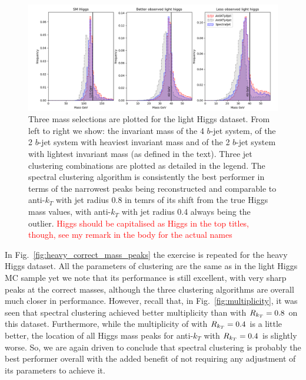 \begin{figure}[htp]
    \includegraphics[width=1.\textwidth]{graphics/mass_peaks/light_long_correct_frequency.png}
    \caption{Three mass selections are plotted for the light Higgs dataset. From left to right we show: the invariant mass of the 4 $b$-jet system, of the 2 $b$-jet system with heaviest invariant mass and of the 2 $b$-jet system with lightest invariant mass (as defined in the text).   Three jet clustering combinations are plotted as detailed in the legend.
The spectral clustering algorithm is consistently the best performer in terms of the narrowest peaks being reconstructed and comparable to anti-$k_T$ with jet radius 0.8 in temrs of its shift from the true Higgs mass values, with  anti-$k_T$ with jet radius 0.4 always being the outlier. 
{\textcolor{red}{Higgs should be capitalised as Higgs in the top titles, though, see my remark in the body for the actual names}}
    }\label{fig:best_correct_h_allocation}
\end{figure}    

In 
Fig.~\ref{fig:heavy_correct_mass_peaks} the exercise is repeated for the heavy Higgs dataset.
All the parameters of \spectral{} clustering are the same as in the light Higgs MC sample yet we note that 
its performance is still excellent, with very sharp peaks at the correct masses, although the three clustering algorithms are overall much closer in performance.
However, recall that, in Fig.~\ref{fig:multiplicity},
it was seen that spectral clustering achieved better multiplicity than \antikt{} with \(R_{k_T}{} = 0.8\) on this dataset. Furthermore, 
while the multiplicity of \antikt{} with \(R_{k_T}{} = 0.4\) is a little better, the location of all Higgs mass peaks for anti-$k_T$ with 
\(R_{k_T} = 0.4\) is slightly worse. So, we are again driven to conclude that spectral clustering is probably the best performer overall with the added benefit of not requiring any adjustment of its parameters to achieve it. 

